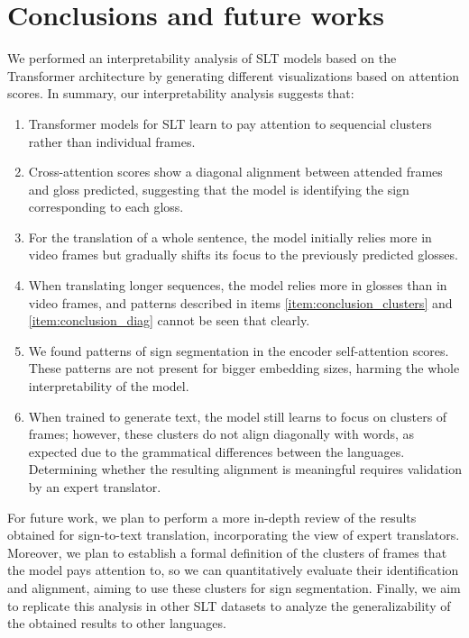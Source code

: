 \section{Conclusions and future works}

We performed an interpretability analysis of SLT models based on the Transformer architecture by generating different visualizations based on attention scores. In summary, our interpretability analysis suggests that:

\begin{enumerate}

    \item Transformer models for SLT learn to pay attention to sequencial clusters rather than individual frames.\label{item:conclusion_clusters}

    \item Cross-attention scores show a diagonal alignment between attended frames and gloss predicted, suggesting that the model is identifying the sign corresponding to each gloss.\label{item:conclusion_diag}

    \item For the translation of a whole sentence, the model initially relies more in video frames but gradually shifts its focus to the previously predicted glosses.
    
    \item When translating longer sequences, the model relies more in glosses than in video frames, and patterns described in items \ref{item:conclusion_clusters} and \ref{item:conclusion_diag} cannot be seen that clearly.

    \item We found patterns of sign segmentation in the encoder self-attention scores. These patterns are not present for bigger embedding sizes, harming the whole interpretability of the model.

    \item When trained to generate text, the model still learns to focus on clusters of frames; however, these clusters do not align diagonally with words, as expected due to the grammatical differences between the languages. Determining whether the resulting alignment is meaningful requires validation by an expert translator.

\end{enumerate}

For future work, we plan to perform a more in-depth review of the results obtained for sign-to-text translation, incorporating the view of expert translators. Moreover, we plan to establish a formal definition of the clusters of frames that the model pays attention to, so we can quantitatively evaluate their identification and alignment, aiming to use these clusters for sign segmentation. 
Finally, we aim to replicate this analysis in other SLT datasets to analyze the generalizability of the obtained results to other languages.
